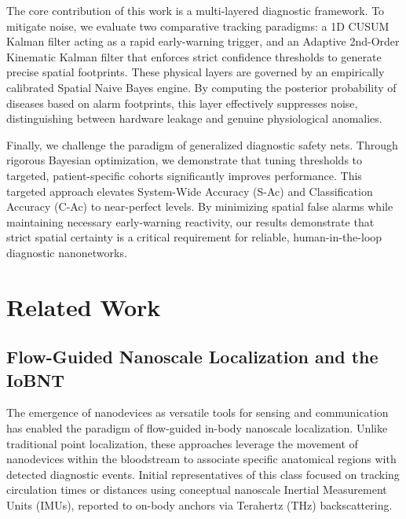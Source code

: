 \documentclass[sigconf]{acmart}
\begin{document}
The core contribution of this work is a multi-layered diagnostic framework. To mitigate noise, we evaluate two comparative tracking paradigms: a 1D CUSUM Kalman filter acting as a rapid early-warning trigger, and an Adaptive 2nd-Order Kinematic Kalman filter that enforces strict confidence thresholds to generate precise spatial footprints. These physical layers are governed by an empirically calibrated Spatial Naive Bayes engine. By computing the posterior probability of diseases based on alarm footprints, this layer effectively suppresses noise, distinguishing between hardware leakage and genuine physiological anomalies.

Finally, we challenge the paradigm of generalized diagnostic safety nets. Through rigorous Bayesian optimization, we demonstrate that tuning thresholds to targeted, patient-specific cohorts significantly improves performance. This targeted approach elevates System-Wide Accuracy (S-Ac) and Classification Accuracy (C-Ac) to near-perfect levels. By minimizing spatial false alarms while maintaining necessary early-warning reactivity, our results demonstrate that strict spatial certainty is a critical requirement for reliable, human-in-the-loop diagnostic nanonetworks.

\section{Related Work}

\subsection{Flow-Guided Nanoscale Localization and the IoBNT}
The emergence of nanodevices as versatile tools for sensing and communication has enabled the paradigm of flow-guided in-body nanoscale localization. Unlike traditional point localization, these approaches leverage the movement of nanodevices within the bloodstream to associate specific anatomical regions with detected diagnostic events. Initial representatives of this class focused on tracking circulation times or distances using conceptual nanoscale Inertial Measurement Units (IMUs), reported to on-body anchors via Terahertz (THz) backscattering. 
\end{document}
